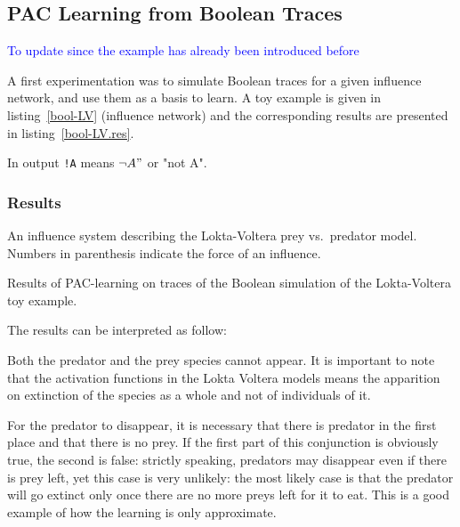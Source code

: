 \documentclass{llncs}
\newcommand{\francois}[1]{\textcolor{blue}{#1}}
\begin{document}
\subsection{PAC Learning from Boolean Traces}

\francois{To update since the example has already been introduced before}

A first experimentation was to simulate Boolean traces for a given influence network, and use them as a basis to learn. 
A toy example is given in listing~\ref{bool-LV} (influence network) and the corresponding results are presented in listing~\ref{bool-LV.res}.

In output \texttt{!A} means $\neg A"$ or "not A".

\subsubsection{Results}

\begin{listfig}[htp]
	
	\caption{An influence system describing the Lokta-Voltera prey vs.\ predator model. Numbers in parenthesis indicate the force of an influence.\label{bool-LV}}
\end{listfig}
\begin{listfig}[htp]
	
	\caption{Results of PAC-learning on traces of the Boolean simulation of the Lokta-Voltera toy example.\label{bool-LV.res}}
\end{listfig}

The results can be interpreted as follow:

Both the predator and the prey species cannot appear. It is important to note that the activation functions in the Lokta Voltera models means the apparition on extinction of the species as a whole and not of individuals of it.

For the predator to disappear, it is necessary that there is predator in the first place and that there is no prey. If the first part of this conjunction is obviously true, the second is false: strictly speaking, predators may disappear even if there is prey left, yet this case is very unlikely: the most likely case is that the predator will go extinct only once there are no more preys left for it to eat. This is a good example of how the learning is only approximate.
\end{document}
